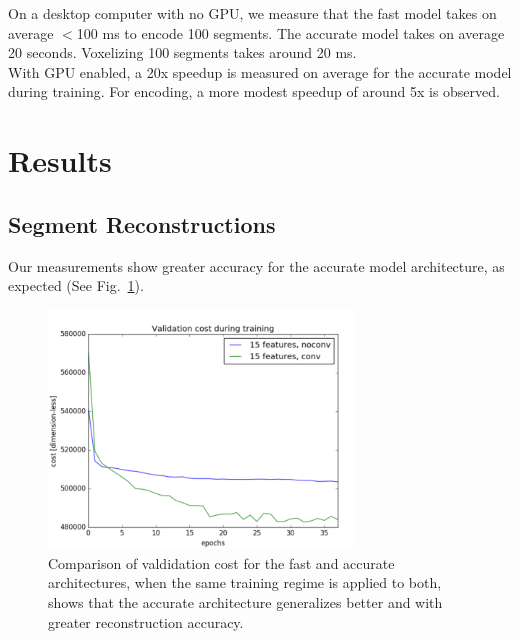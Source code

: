 On a desktop computer with no GPU, we measure that the fast model takes on average $<$100 ms to encode 100 segments. The accurate model takes on average 20 seconds. Voxelizing 100 segments takes around 20 ms.\\

With GPU enabled, a 20x speedup is measured on average for the accurate model during training. For encoding, a more modest speedup of around 5x is observed.

\section{Results}
\label{sec:ae-results}

\subsection{Segment Reconstructions}

Our measurements show greater accuracy for the accurate model architecture, as expected (See Fig.~\ref{fig:trainingcost}).\\

\begin{figure}
  \centering
  \includegraphics[width=3.2in]{images/trainingcost.png}
  \caption{Comparison of valdidation cost for the fast and accurate architectures, when the same training regime is applied to both, shows that the accurate architecture generalizes better and with greater reconstruction accuracy.}
  \label{fig:trainingcost}
\end{figure}


